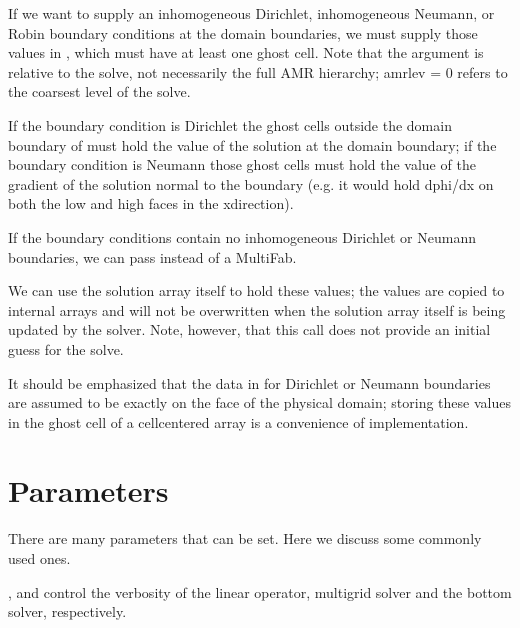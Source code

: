 \documentclass[letterpaper,10pt,english]{sphinxmanual}
\begin{document}
\sphinxAtStartPar
If we want to supply an inhomogeneous Dirichlet, inhomogeneous Neumann, or
Robin boundary conditions at the domain boundaries, we must supply those values
in , which must have at least one ghost cell.
Note that the argument  is relative to the solve, not
necessarily the full AMR hierarchy; amrlev = 0 refers to the coarsest
level of the solve.

\sphinxAtStartPar
If the boundary condition is Dirichlet the ghost cells outside the
domain boundary of  must hold the value of the solution
at the domain boundary;
if the boundary condition is Neumann those ghost cells must hold
the value of the gradient of the solution normal to the boundary
(e.g. it would hold dphi/dx on both the low and high faces in the x\sphinxhyphen{}direction).

\sphinxAtStartPar
If the boundary conditions contain no inhomogeneous Dirichlet or Neumann boundaries,
we can pass  instead of a MultiFab.

\sphinxAtStartPar
We can use the solution array itself to hold these values;
the values are copied to internal arrays and will not be over\sphinxhyphen{}written
when the solution array itself is being updated by the solver.
Note, however, that this call does not provide an initial guess for the solve.

\sphinxAtStartPar
It should be emphasized that the data in  for
Dirichlet or Neumann boundaries are assumed to be exactly on the face
of the physical domain; storing these values in the ghost cell of
a cell\sphinxhyphen{}centered array is a convenience of implementation.


\section{Parameters}
\label{\detokenize{LinearSolvers:parameters}}\label{\detokenize{LinearSolvers:sec-linearsolver-pars}}
\sphinxAtStartPar
There are many parameters that can be set.  Here we discuss some
commonly used ones.

\sphinxAtStartPar
{},  and
 control the verbosity of the
linear operator, multigrid solver and the bottom solver, respectively.
\end{document}
